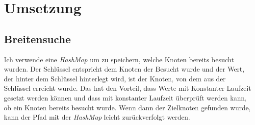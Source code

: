 \documentclass[a4paper,10pt,ngerman]{scrartcl}
\begin{document}
    \section{Umsetzung}

    \subsection{Breitensuche}
    Ich verwende eine \textit{HashMap} um zu speichern, welche Knoten bereits besucht wurden. Der Schlüssel entspricht dem Knoten der Besucht wurde und der Wert, der hinter dem Schlüssel hinterlegt wird, ist der Knoten, von dem aus der Schlüssel erreicht wurde. Das hat den Vorteil, dass Werte mit Konstanter Laufzeit gesetzt werden können und dass mit konstanter Laufzeit überprüft werden kann, ob ein Knoten bereits besucht wurde.
    Wenn dann der Zielknoten gefunden wurde, kann der Pfad mit der \textit{HashMap} leicht zurückverfolgt werden.
\end{document}
